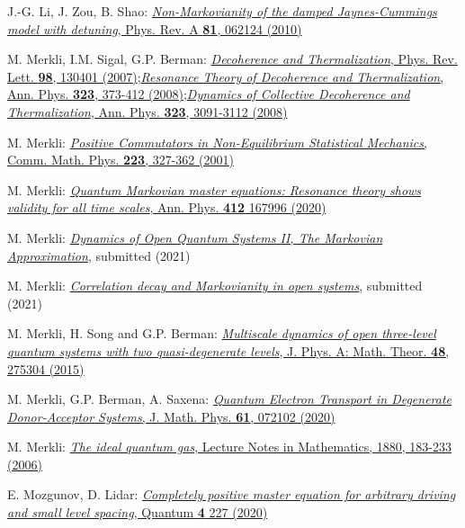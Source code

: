 \documentclass[letterpaper,onecolumn,11pt,accepted=2021-12-09]{quantumarticle}
\numberwithin{equation}{section}
\begin{document}
\begin{thebibliography}{}
J.-G. Li, J. Zou, B. Shao: \href{http://dx.doi.org/10.1103/PhysRevA.81.062124}{{\em Non-Markovianity of the damped Jaynes-Cummings model with detuning}, Phys. Rev. A {\bf 81}, 062124 (2010)}


M. Merkli, I.M. Sigal, G.P. Berman:  \href{http://dx.doi.org/10.1103/PhysRevLett.98.130401}{{\em Decoherence and Thermalization},  Phys. Rev. Lett. {\bf 98}, 130401 (2007)};\quad  \href{http://dx.doi.org/10.1016/j.aop.2007.04.013}{{\em Resonance Theory of Decoherence and Thermalization}, Ann. Phys. {\bf 323}, 373-412 (2008)};\quad  \href{http://dx.doi.org/10.1016/j.aop.2008.07.004}{{\em Dynamics of Collective Decoherence and Thermalization}, Ann. Phys. {\bf 323}, 3091-3112 (2008)}

M. Merkli: \href{http://dx.doi.org/10.1007/s002200100545}{{\em Positive Commutators in Non-Equilibrium Statistical Mechanics},  Comm. Math. Phys. {\bf 223}, 327-362 (2001)}

M. Merkli: \href{http://dx.doi.org/10.1016/j.aop.2019.167996}{{\em Quantum Markovian master equations:
Resonance theory shows validity for all time
scales}, Ann. Phys. {\bf 412} 167996 (2020) }

M. Merkli: \href{https://arxiv.org/abs/2105.00023}{\em Dynamics of Open Quantum Systems II, The Markovian Approximation}, submitted (2021)

M. Merkli:  \href{https://arxiv.org/abs/2107.02515}{\em Correlation decay and Markovianity in open systems}, submitted (2021)

M. Merkli, H. Song and G.P. Berman: \href{http://dx.doi.org/10.1088/1751-8113/48/27/275304}{{\em Multiscale dynamics of open three-level quantum systems with two quasi-degenerate levels}, J. Phys. A: Math. Theor. {\bf 48}, 275304 (2015)}

M. Merkli, G.P. Berman, A. Saxena: \href{http://dx.doi.org/10.1063/1.5138725}{{\em Quantum Electron Transport in Degenerate Donor-Acceptor Systems},  J. Math. Phys. {\bf 61}, 072102 (2020)}

M. Merkli: \href{http://dx.doi.org/10.1007/3-540-33922-1_5}{{\em The ideal quantum gas}, Lecture Notes in Mathematics, 1880, 183-233 (2006)}


E. Mozgunov, D. Lidar: \href{http://dx.doi.org/10.22331/q-2020-02-06-227}{{\em Completely positive master equation for arbitrary driving and small level spacing}, Quantum {\bf 4} 227 (2020)}


\end{thebibliography}
\end{document}
